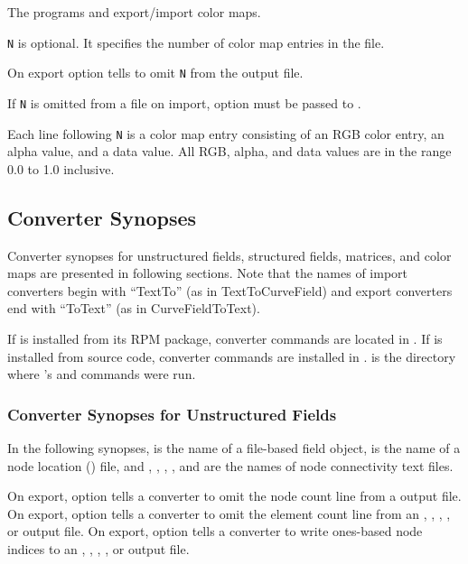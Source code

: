 The programs  and 
export/import color maps.

\verb|N| is optional.  It specifies the number of color map entries in
the file.

On export option  tells  to
omit \verb|N| from the output file.

If \verb|N| is omitted from a file on import, option
 must be passed to .

Each line following \verb|N| is a color map entry consisting of an RGB
color entry, an alpha value, and a data value.  All RGB, alpha, and
data values are in the range 0.0 to 1.0 inclusive.

\subsection{Converter Synopses}
\label{sec:converter_synopses}

Converter synopses for unstructured fields, structured fields, matrices,
and color maps are presented in following sections.   Note that
the names of import converters begin with ``TextTo'' (as in
TextToCurveField) and export converters end with ``ToText'' (as in
CurveFieldToText).

If \sr{} is installed from its RPM package, converter commands are
located in .  If \sr{} is installed
from source code, converter commands are installed in
.   is
the directory where \sr{}'s  and 
commands were run.

\subsubsection{Converter Synopses for Unstructured Fields}
\label{sec:unstruct_field_synopses}

In the following synopses,  is the name of a \sr{}
file-based field object,  is the name of a node location
() file, and , ,
, , and  are the names of node
connectivity text files.

On export, option  tells a converter to omit the
node count line from a  output file.  On export, option
 tells a converter to omit the element count
line from an , , ,
, or  output file.  On export, option
 tells a converter to write ones-based node
indices to an , , ,
, or  output file.


